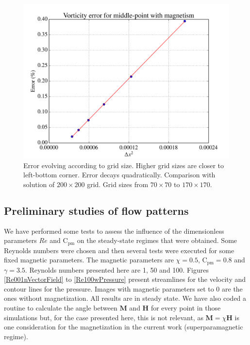 \documentclass[journal]{IEEEtran}
\begin{document}
\begin{figure}[!t]
\centering
\includegraphics[width=\linewidth]{figures/validateMagnetismRe40}
\caption{Error evolving according to grid size. Higher grid sizes are closer to left-bottom corner. Error decays quadratically. Comparison with solution of $200\times 200$ grid. Grid sizes from $70\times 70$ to $170\times 170$. \label{magneticTest}}
\end{figure}



\subsection{Preliminary studies of flow patterns}
We have performed some tests to assess the influence of the dimensionless parameters $\mathit{Re}$ and $\mathrm{C}_\mathrm{pm}$ on the steady-state regimes that were obtained.  Some Reynolds numbers were chosen and then several tests were executed for some fixed magnetic parameters. The magnetic parameters are $\chi=0.5$, $\mathrm{C}_\mathrm{pm}=0.8$ and $\gamma=3.5$. Reynolds numbers presented here are 1, 50 and 100. Figures \ref{Re001nVectorField} to \ref{Re100wPressure} present streamlines for the velocity and contour lines for the pressure. Images with magnetic parameters set to 0 are the ones without magnetization. All results are in steady state. We have also coded a routine to calculate the angle between $\mathbf{M}$ and $\mathbf{H}$ for every point in those simulations but, for the case presented here, this is not relevant, as $\mathbf{M}=\chi\mathbf{H}$ is one consideration for the magnetization in the current work (superparamagnetic regime).
\end{document}
